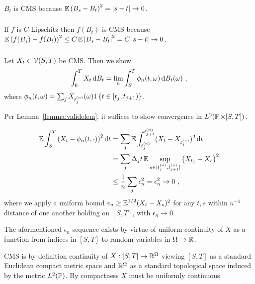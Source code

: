 \documentclass{article}
\begin{document}
        \subsubsection{}
        \(B_t\) is CMS because \(\E\pa{B_s-B_t}^2=\abs{s-t}\rightarrow 0\).
        \subsubsection{}
        If \(f\) is \(C\)-Lipschitz then \(f(B_t)\) is CMS because \(\E\pa{f(B_s)-f(B_t)}^2\le C\E\abs{B_s-B_t}^2=C\abs{s-t}\rightarrow 0\).
        \subsubsection{}
\label{ex3.13c}
        Let \(X_t\in \mcV(S, T)\) be CMS. Then we show
        \[
          \int_0^T X_t \d{B_t}=\lim_n\int_S^T\phi_n(t, \omega)\d{B_t(\omega)}\,\,,
        \]
        where \(\phi_n(t, \omega)=\sum_jX_{t_j^{(n)}}(\omega)1\ca{t\in[t_j,t_{j+1})}\).

        Per Lemma~\ref{lemma:validelem}, it suffices to show convergence in \(L^2(\P\times [S,T])\).


        \begin{align*}
          \E\int_S^T\pa{X_t-\phi_n(t,\cdot)}^2\d{t}
          &=\sum_j\E\int_{t_j^{(n)}}^{t_{j+1}^{(n)}}(X_t-X_{t_j^{(n)}})^2\d{t}\\
          &=\sum_j\Delta_jt\E\sup_{s\in[t_j^{(n)},t_{j+1}^{(n)}]}\pa{X_{t_j}-X_s}^2\\
          &\le\frac{1}{n}\sum_j \epsilon_n^2=\epsilon_n^2\rightarrow 0\,\,,
        \end{align*}
        where we apply a uniform bound \(\epsilon_n\ge \E^{1/2}(X_t-X_{s})^2\) for any \(t,s\) within \(n^{-1}\) distance of one another holding on \([S, T]\), with \(\epsilon_n\rightarrow 0\).

        The aformentioned \(\epsilon_n\) sequence exists by virtue of uniform continuity of \(X\) as a function from indices in \([S, T]\) to random variables in \(\Omega\rightarrow\R\).

        CMS is by definition continuity of \(X:[S,T]\rightarrow\R^{\Omega}\) viewing \([S, T]\) as a standard Euclidean compact metric space and \(\R^\Omega\) as a standard topological space induced by the metric \(L^2(\P)\). By compactness \(X\) must be uniformly continuous.        
        
\end{document}
